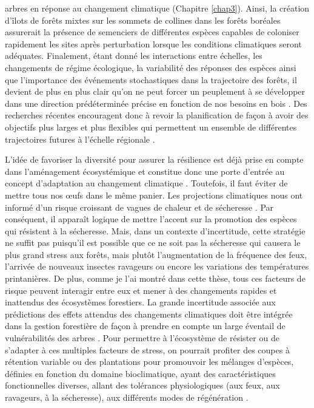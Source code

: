 arbres en réponse au changement climatique (Chapitre \ref{chap3}).
Ainsi, la création d'îlots de forêts mixtes sur les sommets de collines
dans les forêts boréales assurerait la présence de semenciers de
différentes espèces capables de coloniser rapidement les sites après
perturbation lorsque les conditions climatiques seront adéquates.
Finalement, étant donné les interactions entre échelles, les changements
de régime écologique, la variabilité des réponses des espèces ainsi que
l'importance des événements stochastiques dans la trajectoire des
forêts, il devient de plus en plus clair qu'on ne peut forcer un
peuplement à se développer dans une direction prédéterminée précise en
fonction de nos besoins en bois \citep{puettmann_critique_2009}. Des
recherches récentes encouragent donc à revoir la planification de façon
à avoir des objectifs plus larges et plus flexibles qui permettent un
ensemble de différentes trajectoires futures à l'échelle régionale
\citep{messier_dealing_2016, puettmann_critique_2009}.

L'idée de favoriser la diversité pour assurer la résilience est déjà
prise en compte dans l'aménagement écosystémique et constitue donc une
porte d'entrée au concept d'adaptation au changement climatique
\citep{samuel_foret_2011}. Toutefois, il faut éviter de mettre tous nos
\oe{}ufs dans le même panier. Les projections climatiques nous ont
informé d'un risque croissant de vagues de chaleur et de sécheresse
\citep{ipcc_climate_2014}. Par conséquent, il apparaît logique de mettre
l'accent sur la promotion des espèces qui résistent à la sécheresse.
Mais, dans un contexte d'incertitude, cette stratégie ne suffit pas
puisqu'il est possible que ce ne soit pas la sécheresse qui causera le
plus grand stress aux forêts, mais plutôt l'augmentation de la fréquence
des feux, l'arrivée de nouveaux insectes ravageurs ou encore les
variations des températures printanières. De plus, comme je l'ai montré
dans cette thèse, tous ces facteurs de risque peuvent interagir entre
eux et mener à des changements rapides et inattendus des écosystèmes
forestiers. La grande incertitude associée aux prédictions des effets
attendus des changements climatiques doit être intégrée dans la gestion
forestière de façon à prendre en compte un large éventail de
vulnérabilités des arbres \citep{messier_dealing_2016}. Pour permettre à
l'écosystème de résister ou de s'adapter à ces multiples facteurs de
stress, on pourrait profiter des coupes à rétention variable ou des
plantations pour promouvoir les mélanges d'espèces, définies en fonction
du domaine bioclimatique, ayant des caractéristiques fonctionnelles
diverses, allant des tolérances physiologiques (aux feux, aux ravageurs,
à la sécheresse), aux différents modes de régénération \citep[p.~ex.,
banque de graines, cônes sérotineux, reproduction
végétative;][]{messier_functional_2019, puettmann_critique_2009}.

